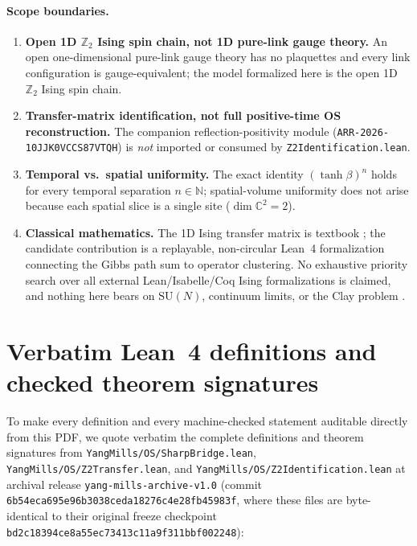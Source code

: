 \documentclass[11pt]{article}
\theoremstyle{remark}
\theoremstyle{definition}
\newcommand{\lean}[1]{\texttt{#1}}
\newcommand{\anchor}{6b54eca695e96b3038ceda18276c4e28fb45983f}
\newcommand{\C}{\mathbb{C}}
\newcommand{\Z}{\mathbb{Z}}
\newcommand{\SU}{\mathrm{SU}}
\begin{document}
\paragraph{Scope boundaries.}
\begin{enumerate}
  \item \textbf{Open 1D $\Z_2$ Ising spin chain, not 1D pure-link gauge theory.} An open
  one-dimensional pure-link gauge theory has no plaquettes and every link configuration is
  gauge-equivalent; the model formalized here is the open 1D $\Z_2$ Ising spin chain.
  \item \textbf{Transfer-matrix identification, not full positive-time OS reconstruction.}
  The companion reflection-positivity module (\texttt{ARR-2026-10JJK0VCCS87VTQH}) is
  \emph{not} imported or consumed by \lean{Z2Identification.lean}.
  \item \textbf{Temporal vs.\ spatial uniformity.} The exact identity $(\tanh\beta)^n$
  holds for every temporal separation $n \in \mathbb{N}$; spatial-volume uniformity does not
  arise because each spatial slice is a single site ($\dim \C^2 = 2$).
  \item \textbf{Classical mathematics.} The 1D Ising transfer matrix is textbook
  \cite{Simon}; the candidate contribution is a replayable, non-circular Lean~4
  formalization connecting the Gibbs path sum to operator clustering. No exhaustive
  priority search over all external Lean/Isabelle/Coq Ising formalizations is claimed, and
  nothing here bears on $\SU(N)$, continuum limits, or the Clay problem \cite{Clay}.
\end{enumerate}

\section{Verbatim Lean~4 definitions and checked theorem signatures}\label{sec:verbatim}

To make every definition and every machine-checked statement auditable directly from this
PDF, we quote verbatim the complete definitions and theorem signatures from
\texttt{YangMills/OS/SharpBridge.lean}, \texttt{YangMills/OS/Z2Transfer.lean}, and
\texttt{YangMills/OS/Z2Identification.lean} at archival release
\texttt{yang-mills-archive-v1.0} (commit \texttt{\anchor}, where these files are
byte-identical to their original freeze checkpoint
\texttt{bd2c18394ce8a55ec73413c11a9f311bbf002248}):
\end{document}
